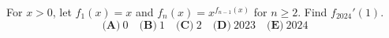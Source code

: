 For $x>0$, let $f_1(x)=x$ and $f_n(x)=x^{f_{n-1}(x)}$ for $n\ge2$. Find $f_{2024}'(1)$.
\[\textbf{(A)}~0\quad\textbf{(B)}~1\quad\textbf{(C)}~2\quad\textbf{(D)}~2023\quad\textbf{(E)}~2024\]
